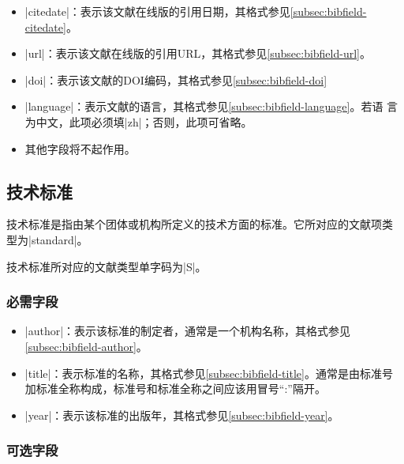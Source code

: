 \begin{itemize}
\item |citedate|：表示该文献在线版的引用日期，其格式参见\ref{subsec:bibfield-citedate}。
\item |url|：表示该文献在线版的引用URL，其格式参见\ref{subsec:bibfield-url}。
\item |doi|：表示该文献的DOI编码，其格式参见\ref{subsec:bibfield-doi}
\item |language|：表示文献的语言，其格式参见\ref{subsec:bibfield-language}。若语
  言为中文，此项必须填|zh|；否则，此项可省略。
\item 其他字段将不起作用。
\end{itemize}

\subsection{技术标准}\label{subsec:bibtype-standard}

技术标准是指由某个团体或机构所定义的技术方面的标准。它所对应的{\BibTeX}文献项类
型为|standard|。

技术标准所对应的文献类型\cite{gbt3469-1983}单字码为|S|。

\subsubsection{必需字段}

\begin{itemize}
\item |author|：表示该标准的制定者，通常是一个机构名称，其格式参见\ref{subsec:bibfield-author}。
\item |title|：表示标准的名称，其格式参见\ref{subsec:bibfield-title}。通常是由标准号
 加标准全称构成，标准号和标准全称之间应该用冒号``:''隔开。
\item |year|：表示该标准的出版年，其格式参见\ref{subsec:bibfield-year}。
\end{itemize}

\subsubsection{可选字段}

